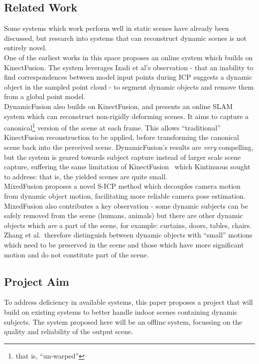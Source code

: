 \subsection{Related Work}\label{subsec:related-work}
Some systems which work perform well in static scenes have already been discussed\cite{kinectfusionms, kintinuous, elasticfusion},
but research into systems that can reconstruct dynamic scenes is not entirely novel.
\\[1ex]
One of the earliest works in this space\cite{Keller:2013aa} proposes an online system which builds on KinectFusion\cite{kinectfusionms}.
The system leverages Izadi et al's\cite{izadi2011kinectfusion} observation - that an inability to find correspondences
between model input points during ICP suggests a dynamic object in the sampled point cloud - to segment dynamic objects
and remove them from a global point model.
\\[1ex]
DynamicFusion\cite{dynamicfusion} also builds on KinectFusion\cite{kinectfusionms}, and presents an online SLAM system
which can reconstruct non-rigidly deforming scenes.
It aims to capture a canonical\footnote{that is, ``un-warped''} version of the scene at each frame.
This allows ``traditional'' KinectFusion reconstruction to be applied, before transforming the canonical scene back into
the perceived scene.
DynamicFusion's results are \emph{very} compelling, but the system is geared towards subject capture instead of larger
scale scene capture, suffering the same limitation of KinectFusion~\cite{kinectfusionms} which Kintinuous\cite{kintinuous}
sought to address: that is, the yielded scenes are quite small.
\\[1ex]
MixedFusion\cite{Zhang:2018aa} proposes a novel S-ICP method which decouples camera motion from dynamic object motion,
facilitating more reliable camera pose estimation.
MixedFusion also contributes a key observation - some dynamic subjects can be safely removed from the scene (humans,
animals) but there are other dynamic objects which \emph{are} a part of the scene, for example: curtains, doors, tables,
chairs.
Zhang et al.\ therefore distinguish between dynamic objects with ``small'' motions which need to be preserved in the scene
and those which have more significant motion and do not constitute part of the scene.

\subsection{Project Aim}\label{subsec:proposed-project}
To address deficiency in available systems, this paper proposes a project that will build on existing systems to better
handle indoor scenes containing dynamic subjects.
The system proposed here will be an offline system, focussing on the quality and reliability of the output scene.
